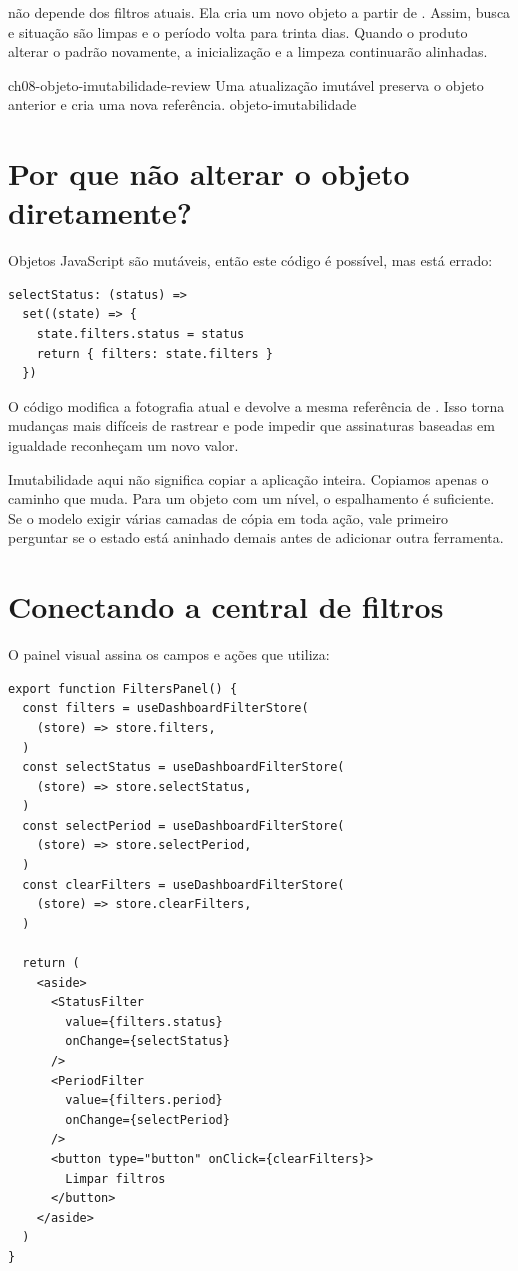  não depende dos filtros atuais. Ela cria um novo objeto a
partir de . Assim, busca e situação são limpas e o
período volta para trinta dias. Quando o produto alterar o padrão novamente, a
inicialização e a limpeza continuarão alinhadas.

\imagemcapitulo
  {ch08-objeto-imutabilidade-review}
  {Uma atualização imutável preserva o objeto anterior e cria uma nova referência.}
  {objeto-imutabilidade}

\section{Por que não alterar o objeto diretamente?}

Objetos JavaScript são mutáveis, então este código é possível, mas está errado:

\begin{lstlisting}
selectStatus: (status) =>
  set((state) => {
    state.filters.status = status
    return { filters: state.filters }
  })
\end{lstlisting}

O código modifica a fotografia atual e devolve a mesma referência de
. Isso torna mudanças mais difíceis de rastrear e pode impedir
que assinaturas baseadas em igualdade reconheçam um novo valor.

Imutabilidade aqui não significa copiar a aplicação inteira. Copiamos apenas o
caminho que muda. Para um objeto com um nível, o espalhamento é suficiente. Se
o modelo exigir várias camadas de cópia em toda ação, vale primeiro perguntar se
o estado está aninhado demais antes de adicionar outra ferramenta.

\section{Conectando a central de filtros}

O painel visual assina os campos e ações que utiliza:

\begin{lstlisting}[caption={Consumidor envia intenções, sem montar o próximo estado.}]
export function FiltersPanel() {
  const filters = useDashboardFilterStore(
    (store) => store.filters,
  )
  const selectStatus = useDashboardFilterStore(
    (store) => store.selectStatus,
  )
  const selectPeriod = useDashboardFilterStore(
    (store) => store.selectPeriod,
  )
  const clearFilters = useDashboardFilterStore(
    (store) => store.clearFilters,
  )

  return (
    <aside>
      <StatusFilter
        value={filters.status}
        onChange={selectStatus}
      />
      <PeriodFilter
        value={filters.period}
        onChange={selectPeriod}
      />
      <button type="button" onClick={clearFilters}>
        Limpar filtros
      </button>
    </aside>
  )
}
\end{lstlisting}

